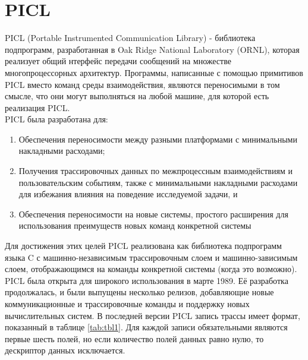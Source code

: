 \section{PICL}
PICL (Portable Instrumented Communication Library)  - библиотека подпрограмм, разработанная в Oak Ridge National Laboratory (ORNL), которая реализует общий
нтерфейс передачи сообщений на множестве многопроцессорных архитектур. Программы, написанные с помощью примитивов PICL вместо команд среды взаимодействия, являются переносимыми в том смысле, что они могут выполняться на любой машине, для которой есть реализация PICL.\\
PICL была разработана для:
\begin{enumerate} 
\item Обеспечения переносимости между разными платформами с минимальными накладными расходами;
\item Получения трассировочных данных по межпроцессным взаимодействиям и пользовательским событиям, также с минимальными накладными расходами для избежания влияния на поведение исследуемой задачи, и
\item Обеспечения переносимости на новые системы, простого расширения для использования преимуществ новых команд конкретной системы
\end{enumerate} 
Для достижения этих целей PICL реализована как библиотека подпрограмм языка C с машинно-независимым трассировочным слоем и машинно-зависимым слоем, отображающимся на команды конкретной системы (когда это возможно). PICL  была открыта для широкого использования в марте 1989. Её разработка продолжалась, и были выпущены несколько релизов, добавляющие новые коммуникационные и трассировочные команды и поддержку новых вычислительных систем.
В последней версии PICL запись трассы имеет формат, показанный в таблице \ref{tab:tbl1}. Для каждой записи обязательными являются первые шесть полей, но если количество полей данных равно нулю, то дескриптор данных исключается.

